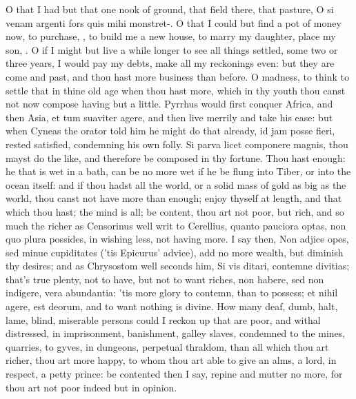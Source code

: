 {O that I had but that one nook of ground, that field there, that
pasture, O si venam argenti fors quis mihi monstret-. O that I could
but find a pot of money now, to purchase, \etc{}, to build me a new house,
to marry my daughter, place my son, \etc{}. O if I might but live a
while longer to see all things settled, some two or three years, I
would pay my debts, make all my reckonings even: but they are come and
past, and thou hast more business than before. O madness, to think to
settle that in thine old age when thou hast more, which in thy youth
thou canst not now compose having but a little. Pyrrhus would
first conquer Africa, and then Asia, et tum suaviter agere, and then
live merrily and take his ease: but when Cyneas the orator told him he
might do that already, id jam posse fieri, rested satisfied, condemning
his own folly. Si parva licet componere magnis, thou mayst do the like,
and therefore be composed in thy fortune. Thou hast enough: he that is
wet in a bath, can be no more wet if he be flung into Tiber, or into
the ocean itself: and if thou hadst all the world, or a solid mass of
gold as big as the world, thou canst not have more than enough; enjoy
thyself at length, and that which thou hast; the mind is all; be
content, thou art not poor, but rich, and so much the richer as
Censorinus well writ to Cerellius, quanto pauciora optas, non quo
plura possides, in wishing less, not having more. I say then, Non
adjice opes, sed minue cupiditates ('tis Epicurus' advice), add
no more wealth, but diminish thy desires; and as Chrysostom well
seconds him, Si vis ditari, contemne divitias; that's true plenty, not
to have, but not to want riches, non habere, sed non indigere, vera
abundantia: 'tis more glory to contemn, than to possess; et nihil
agere, est deorum, and to want nothing is divine. How many deaf, dumb,
halt, lame, blind, miserable persons could I reckon up that are poor,
and withal distressed, in imprisonment, banishment, galley slaves,
condemned to the mines, quarries, to gyves, in dungeons, perpetual
thraldom, than all which thou art richer, thou art more happy, to whom
thou art able to give an alms, a lord, in respect, a petty prince:
be contented then I say, repine and mutter no more, for thou art
not poor indeed but in opinion.

}
